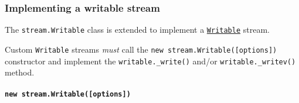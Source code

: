 \subsubsection{Implementing a writable
stream}\label{implementing-a-writable-stream}

The \texttt{stream.Writable} class is extended to implement a
\hyperref[class-streamwritable]{\texttt{Writable}} stream.

Custom \texttt{Writable} streams \emph{must} call the
\texttt{new\ stream.Writable({[}options{]})} constructor and implement
the \texttt{writable.\_write()} and/or \texttt{writable.\_writev()}
method.

\paragraph{\texorpdfstring{\texttt{new\ stream.Writable({[}options{]})}}{new stream.Writable({[}options{]})}}\label{new-stream.writableoptions}

